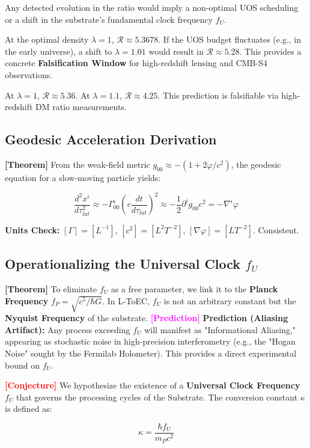 \documentclass[11pt,titlepage]{article}
\newcommand{\tagtheo}{\textcolor{green!60!black}{\textbf{[Theorem]}} }
\newcommand{\tagconj}{\textcolor{red}{\textbf{[Conjecture]}} }
\newcommand{\tagpred}{\textcolor{magenta}{\textbf{[Prediction]}} }
\begin{document}
Any detected evolution in the ratio would imply a non-optimal UOS scheduling or a shift in the substrate's fundamental clock frequency $f_U$.

At the optimal density $\lambda=1$, $\mathcal{R} \approx 5.3678$. If the UOS budget fluctuates (e.g., in the early universe), a shift to $\lambda=1.01$ would result in $\mathcal{R} \approx 5.28$. This provides a concrete \textbf{Falsification Window} for high-redshift lensing and CMB-S4 observations.

At $\lambda=1$, $\mathcal{R} \approx 5.36$. At $\lambda=1.1$, $\mathcal{R} \approx 4.25$. This prediction is falsifiable via high-redshift DM ratio measurements.

\subsection{Geodesic Acceleration Derivation}
\tagtheo From the weak-field metric $g_{00} \approx -(1 + 2\varphi/c^2)$, the geodesic equation for a slow-moving particle yields:

\begin{equation}
\frac{d^2 x^i}{d\tau_{lat}^2} \approx -\Gamma^i_{00} (c \frac{dt}{d\tau_{lat}})^2 \approx -\frac{1}{2} \partial^i g_{00} c^2 = -\nabla^i \varphi
\end{equation}

\textbf{Units Check:} $[\Gamma] = [L^{-1}]$, $[c^2] = [L^2 T^{-2}]$, $[\nabla \varphi] = [L T^{-2}]$. Consistent.


\subsection{Operationalizing the Universal Clock $f_U$}
\tagtheo To eliminate $f_U$ as a free parameter, we link it to the \textbf{Planck Frequency} $f_P = \sqrt{c^5 / \hbar G}$. In L-ToEC, $f_U$ is not an arbitrary constant but the \textbf{Nyquist Frequency} of the substrate. 
\tagpred \textbf{Prediction (Aliasing Artifact):} Any process exceeding $f_U$ will manifest as "Informational Aliasing," appearing as stochastic noise in high-precision interferometry (e.g., the "Hogan Noise" sought by the Fermilab Holometer). This provides a direct experimental bound on $f_U$.

\tagconj We hypothesize the existence of a \textbf{Universal Clock Frequency} $f_U$ that governs the processing cycles of the Substrate. The conversion constant $\kappa$ is defined as:

\begin{equation}
\kappa = \frac{\hbar f_U}{m_P c^2}
\end{equation}
\end{document}
